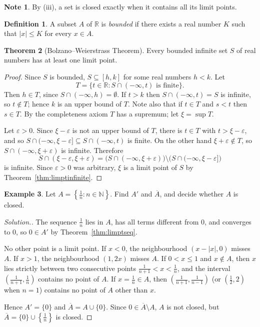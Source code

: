 \documentclass[11pt,a4paper]{article}
\numberwithin{equation}{section}
\theoremstyle{definition}
\newtheorem{thm}{Theorem}[subsection]
\newtheorem{defn}[thm]{Definition}
\newtheorem{exa}[thm]{Example}
\newtheorem*{note}{Note}
\newenvironment{solution}
  {\renewcommand{\qedsymbol}{}\begin{proof}[\textit{Solution}.]}
  {\end{proof}}
\begin{document}
\begin{note}
By (iii), a set is closed exactly when it contains all its limit points.
\end{note}


\begin{defn}
A subset $A$ of $\mathbb{R}$ is \emph{bounded} if there exists a real number $K$ such that $|x| \leq K$ for every $x\in A$.
\end{defn}


\begin{thm}[Bolzano--Weierstrass Theorem]
Every bounded infinite set $S$ of real numbers has at least one limit point.
\end{thm}

\begin{proof}
Since $S$ is bounded, $S\subseteq [h,k]$ for some real numbers $h<k$. Let
$$T = \{t\in\mathbb{R}: S \cap (-\infty, t) \text{ is finite}\}.$$
Then $h \in T$, since $S\cap(-\infty,h) = \emptyset$. If $t > k$ then $S \cap (-\infty, t) = S$ is infinite, so $t\notin T$; hence $k$ is an upper bound of $T$. Note also that if $t\in T$ and $s<t$ then $s\in T$. By the completeness axiom $T$ has a supremum; let $\xi = \sup T$.

Let $\varepsilon > 0$. Since $\xi-\varepsilon$ is not an upper bound of $T$, there is $t\in T$ with $t>\xi-\varepsilon$, and so $S\cap(-\infty,\xi-\varepsilon]\subseteq S\cap(-\infty,t)$ is finite. On the other hand $\xi + \varepsilon\notin T$, so $S\cap(-\infty, \xi+\varepsilon)$ is infinite. Therefore
$$S \cap (\xi - \varepsilon, \xi + \varepsilon) = \bigl(S\cap(-\infty, \xi+\varepsilon)\bigr) \setminus \bigl(S\cap(-\infty,\xi-\varepsilon]\bigr)$$
is infinite. Since $\varepsilon>0$ was arbitrary, $\xi$ is a limit point of $S$ by Theorem~\ref{thm:limptinfinite}.
\end{proof}

\begin{exa}
Let $A = \left\{\frac{1}{n}: n\in\mathbb{N}\right\}$. Find $A'$ and $\overline{A}$, and decide whether $A$ is closed.
\end{exa}

\begin{solution}
The sequence $\frac{1}{n}$ lies in $A$, has all terms different from $0$, and converges to $0$, so $0\in A'$ by Theorem~\ref{thm:limptseq}.

No other point is a limit point. If $x<0$, the neighbourhood $(x - |x|, 0)$ misses $A$. If $x>1$, the neighbourhood $(1,2x)$ misses $A$. If $0<x\leq 1$ and $x\notin A$, then $x$ lies strictly between two consecutive points $\frac{1}{n+1}<x<\frac{1}{n}$, and the interval $\left(\frac{1}{n+1},\frac{1}{n}\right)$ contains no point of $A$. If $x = \frac{1}{n}\in A$, then $\left(\frac{1}{n+1},\frac{1}{n-1}\right)$ (or $\left(\frac{1}{2},2\right)$ when $n=1$) contains no point of $A$ other than $x$.

Hence $A' = \{0\}$ and $\overline{A} = A\cup\{0\}$. Since $0\in\overline{A}\setminus A$, $A$ is not closed, but $\overline{A} = \{0\}\cup\left\{\frac{1}{n}\right\}$ is closed.
\end{solution}
\end{document}
